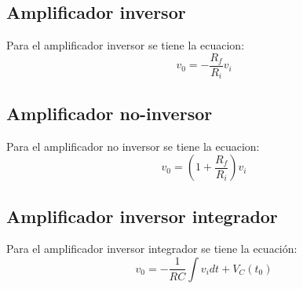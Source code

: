 \documentclass[DIV=calc, paper=a4, fontsize=11pt]{scrartcl}
\begin{document}
\begin{multicols}{2}



\subsection*{Amplificador inversor}
Para el amplificador inversor se tiene la ecuacion:
\begin{equation}
    v_0= -\frac{R_f}{R_i} v_i
\end{equation}

\subsection*{Amplificador no-inversor}
Para el amplificador no inversor se tiene la ecuacion:
\begin{equation}
    v_0= \left(1 + \frac{R_f}{R_i}\right)v_i
\end{equation}


\subsection*{Amplificador inversor integrador}
Para el amplificador inversor integrador se tiene la ecuación:
\begin{equation}
    v_0 =- \frac{1}{RC} \int v_i dt + V_C(t_0)
\end{equation}



\end{multicols}
\end{document}
